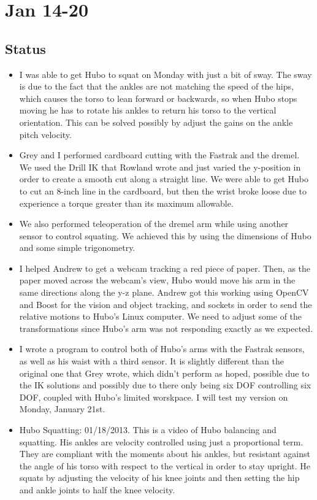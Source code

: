 \documentclass[letterpaper, 10 pt]{report}
\begin{document}
\section*{Jan 14-20}
\subsection*{Status}
\begin{itemize}
\item I was able to get Hubo to squat on Monday with just a bit of sway. The
sway is due to the fact that the ankles are not matching the speed of the hips,
which causes the torso to lean forward or backwards, so when Hubo stops moving
he has to rotate his ankles to return his torso to the vertical orientation.
This can be solved possibly by adjust the gains on the ankle pitch velocity.
\item Grey and I performed cardboard cutting with the Fastrak and the dremel. We
used the Drill IK that Rowland wrote and just varied the y-position in order to
create a smooth cut along a straight line. We were able to get Hubo to cut an
8-inch line in the cardboard, but then the wrist broke loose due to experience a
torque greater than its maximum allowable.
\item We also performed teleoperation of the dremel arm while using another sensor to control squating. We achieved this by using the dimensions of Hubo and some simple trigonometry.
\item I helped Andrew to get a webcam tracking a red piece of paper. Then, as the paper moved across the webcam's view, Hubo would move his arm in the same directions along the y-z plane. Andrew got this working using OpenCV and Boost for the vision and object tracking, and sockets in order to send the relative motions to Hubo's Linux computer. We need to adjust some of the transformations since Hubo's arm was not responding exactly as we expected.
\item I wrote a program to control both of Hubo's arms with the Fastrak sensors, as well as his waist with a third sensor. It is slightly different than the original one that Grey wrote, which didn't perform as hoped, possible due to the IK solutions and possibly due to there only being six DOF controlling six DOF, coupled with Hubo's limited worskpace. I will test my version on Monday, January 21st.
\item Hubo Squatting: 01/18/2013. This is a video of Hubo balancing and squatting. His ankles are velocity controlled using just a proportional term. They are compliant with the moments about his ankles, but resistant against the angle of his torso with respect to the vertical in order to stay upright. He squats by adjusting the velocity of his knee joints and then setting the hip and ankle joints to half the knee velocity.

\end{itemize}
\end{document}
